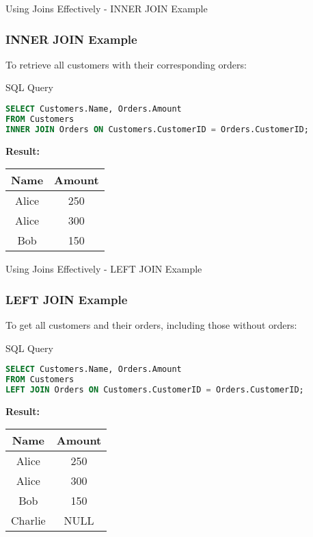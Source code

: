 \documentclass[aspectratio=169]{beamer}
\begin{document}
\begin{frame}[fragile]{Using Joins Effectively - INNER JOIN Example}
    \frametitle{INNER JOIN Example}
    To retrieve all customers with their corresponding orders:
    
    \begin{block}{SQL Query}
    \begin{lstlisting}[language=SQL]
SELECT Customers.Name, Orders.Amount
FROM Customers
INNER JOIN Orders ON Customers.CustomerID = Orders.CustomerID;
    \end{lstlisting}
    \end{block}

    \textbf{Result:}
    \begin{center}
        \begin{tabular}{|c|c|}
            \hline
            Name  & Amount \\
            \hline
            Alice & 250    \\
            Alice & 300    \\
            Bob   & 150    \\
            \hline
        \end{tabular}
    \end{center}
\end{frame}

\begin{frame}[fragile]{Using Joins Effectively - LEFT JOIN Example}
    \frametitle{LEFT JOIN Example}
    To get all customers and their orders, including those without orders:
    
    \begin{block}{SQL Query}
    \begin{lstlisting}[language=SQL]
SELECT Customers.Name, Orders.Amount
FROM Customers
LEFT JOIN Orders ON Customers.CustomerID = Orders.CustomerID;
    \end{lstlisting}
    \end{block}

    \textbf{Result:}
    \begin{center}
        \begin{tabular}{|c|c|}
            \hline
            Name    & Amount \\
            \hline
            Alice   & 250    \\
            Alice   & 300    \\
            Bob     & 150    \\
            Charlie & NULL   \\
            \hline
        \end{tabular}
    \end{center}
\end{frame}
\end{document}

